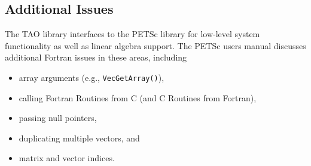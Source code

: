 \subsection{Additional Issues}

The TAO library interfaces to the PETSc library for
low-level system functionality as well as linear algebra support.  The
PETSc users manual discusses additional Fortran issues in these areas,
including
\begin{itemize}
\item array arguments (e.g., {\tt VecGetArray()}),
\item calling Fortran Routines from C (and C Routines from Fortran),
\item passing null pointers,
\item duplicating multiple vectors, and
\item matrix and vector indices.
\end{itemize}


